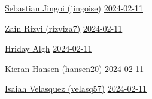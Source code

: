 \documentclass{article}
\begin{document}
\newline
\newline
\begin{center}
    \underline{Sebastian Jingoi (jingoise)\hspace{0.8cm}}\hspace{1.5cm}\underline{\hspace{1.7cm}}\hspace{1.5cm} \underline{2024-02-11\hspace{1.25cm}} \newline
\end{center}
\begin{center}
    \underline{Zain Rizvi (rizviza7)\hspace{1.8cm}}\hspace{1.4cm} \underline{2024-02-11\hspace{1.25cm}} \newline
\end{center}
\begin{center}
    \underline{Hriday Algh\hspace{2.5cm}}\hspace{2.4cm} \underline{2024-02-11\hspace{1.25cm}} \newline
\end{center}
\begin{center}
    \underline{Kieran Hansen (hansen20)\hspace{1cm}}\hspace{1.5cm}\underline{\hspace{1.7cm}}\hspace{1.5cm} \underline{2024-02-11\hspace{1.25cm}} \newline
\end{center}
\begin{center}
    \underline{Isaiah Velasquez (velasq57)\hspace{1.8cm}}\hspace{1.4cm} \underline{2024-02-11\hspace{1.25cm}} \newline
\end{center}
\end{document}
